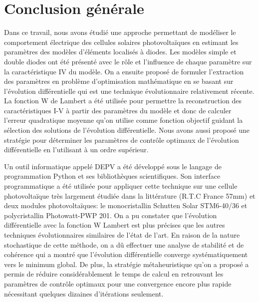 \chapter*{Conclusion générale}
\label{sec:conc}
Dans ce travail, nous avons étudié une approche permettant de modéliser le comportement électrique des cellules solaires photovoltaïques en estimant les paramètres des modèles d'éléments localisés à diodes. Les modèles simple et double diodes ont été présenté avec le rôle et l'influence de chaque paramètre sur la caractéristique IV du modèle. On a ensuite proposé de formuler l'extraction des paramètres en problème d'optimisation mathématique en se basant sur l'évolution différentielle qui est une technique évolutionnaire relativement récente. La fonction W de Lambert a été utilisée pour permettre la reconstruction des caractéristiques I-V à partir des paramètres du modèle et donc de calculer l'erreur quadratique moyenne qu'on utilise comme fonction objectif guidant la sélection des solutions de l'évolution différentielle. Nous avons aussi proposé une stratégie pour déterminer les paramètres de contrôle optimaux de l'évolution différentielle en l'utilisant à un ordre supérieur.

Un outil informatique appelé DEPV a été développé sous le langage de programmation Python et ses bibliothèques scientifiques. Son interface programmatique a été utilisée pour appliquer cette technique sur une cellule photovoltaïque très largement étudiée dans la littérature (R.T.C France 57mm) et deux modules photovoltaïques: le monocristallin Schutten Solar STM6-40/36 et polycristallin Photowatt-PWP 201. On a pu constater que l'évolution différentielle avec la fonction W Lambert est plus précises que les autres techniques évolutionnaires similaires de l'état de l'art. En raison de la nature stochastique de cette méthode, on a dû effectuer une analyse de stabilité et de cohérence qui a montré que l'évolution différentielle converge systématiquement vers le minimum global. De plus, la stratégie métaheuristique qu'on a proposé a permis de réduire considérablement le temps de calcul en retrouvant les paramètres de contrôle optimaux pour une convergence encore plus rapide nécessitant quelques dizaines d'itérations seulement.

